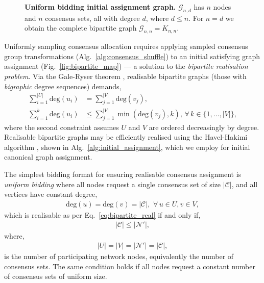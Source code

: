 \documentclass[twocolumn, aps, amsmath, amssymb, nofootinbib, superscriptaddress, longbibliography, floatfix, eqsecnum, rmp]{revtex4-2}
\begin{document}
\begin{figure}[!htb]
	\centering
	
	\hfill
	
	\hfill
	
	\caption{\textbf{Uniform bidding initial assignment graph.} \mbox{$\mathcal{G}_{n,d}$} has $n$ nodes and $n$ consensus sets, all with degree $d$, where \mbox{$d\leq n$}. For \mbox{$n=d$} we obtain the complete bipartite graph \mbox{$\mathcal{G}_{n,n}=K_{n,n}$.}}\label{fig:butterfly_graph_comp}
\end{figure}

Uniformly sampling consensus allocation requires applying sampled consensus group transformations (Alg.~\ref{alg:consensus_shuffle}) to an initial satisfying graph assignment (Fig.~\ref{fig:bipartite_map}) --- a solution to the \emph{bipartite realisation problem}. Via the Gale-Ryser theorem \cite{Gale1957, Ryser1957}, realisable bipartite graphs (those with \emph{bigraphic} degree sequences) demands,
\begin{align} \label{eq:bipartite_real}
	\sum_{i=1}^{|U|} \mathrm{deg}(u_i) &= \sum_{j=1}^{|V|} \mathrm{deg}(v_j),\\
	\sum_{i=1}^k \mathrm{deg}(u_i) &\leq \sum_{j=1}^{|V|} \min(\mathrm{deg}(v_j),k),\,\forall\, k\in\{1,\dots,|V|\},\nonumber
\end{align}
where the second constraint assumes $U$ and $V$ are ordered decreasingly by degree. Realisable bipartite graphs may be efficiently realised using the Havel-Hakimi algorithm \cite{Havel1955, Hakimi62}, shown in Alg.~\ref{alg:initial_assignment}, which we employ for initial canonical graph assignment.


The simplest bidding format for ensuring realisable consensus assignment is \emph{uniform bidding} where all nodes request a single consensus set of size $|\mathcal{C}|$, and all vertices have constant degree,
\begin{align}
	\mathrm{deg}(u) = \mathrm{deg}(v)= |\mathcal{C}|,\,\,\forall\, u\in U, v\in V,
\end{align}
which is realisable as per Eq.~\eqref{eq:bipartite_real} if and only if,
\begin{align}
	|\mathcal{C}| \leq |\mathcal{N}'|,
\end{align}
where,
\begin{align}
	|U|=|V|=|\mathcal{N}'|=|\mathcal{C}|,
\end{align}
is the number of participating network nodes, equivalently the number of consensus sets. The same condition holds if all nodes request a constant number of consensus sets of uniform size.
\end{document}
